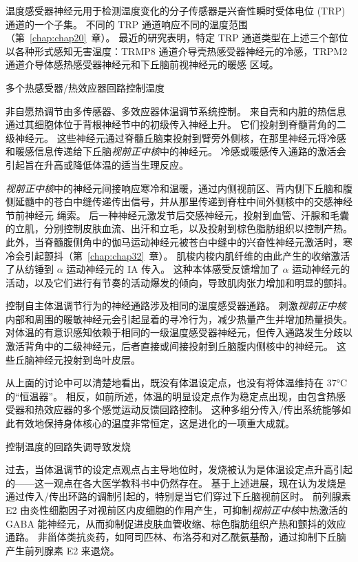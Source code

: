 温度感受器神经元用于检测温度变化的分子传感器是兴奋性瞬时受体电位 (TRP) 通道的一个子集。
不同的 TRP 通道响应不同的温度范围（第~\ref{chap:chap20}~章）。
最近的研究表明，特定 TRP 通道类型在上述三个部位以各种形式感知无害温度：TRMP8 通道介导壳热感受器神经元的冷感，TRPM2 通道介导体感热感受器神经元和下丘脑前视神经元的暖感 区域。


多个热感受器/热效应器回路控制温度

非自愿热调节由多传感器、多效应器体温调节系统控制。
来自壳和内脏的热信息通过其细胞体位于背根神经节中的初级传入神经上升。
它们投射到脊髓背角的二级神经元。
这些神经元通过脊髓丘脑束投射到臂旁外侧核，在那里神经元将冷感和暖感信息传递给下丘脑\textit{视前正中核}中的神经元。
冷感或暖感传入通路的激活会引起旨在升高或降低体温的适当生理反应。


\textit{视前正中核}中的神经元间接响应寒冷和温暖，通过内侧视前区、背内侧下丘脑和腹侧延髓中的苍白中缝传递传出信号，并从那里传递到脊柱中间外侧核中的交感神经节前神经元 绳索。
后一种神经元激发节后交感神经元，投射到血管、汗腺和毛囊的立肌，分别控制皮肤血流、出汗和立毛，以及投射到棕色脂肪组织以控制产热。
此外，当脊髓腹侧角中的伽马运动神经元被苍白中缝中的兴奋性神经元激活时，寒冷会引起颤抖（第~\ref{chap:chap32}~章）。
肌梭内梭内肌纤维的由此产生的收缩激活了从纺锤到 $ \alpha $ 运动神经元的 IA 传入。
这种本体感受反馈增加了 $ \alpha $ 运动神经元的活动，以及它们进行有节奏的活动爆发的倾向，导致肌肉张力增加和明显的颤抖。


控制自主体温调节行为的神经通路涉及相同的温度感受器通路。
刺激\textit{视前正中核}内部和周围的暖敏神经元会引起显着的寻冷行为，减少热量产生并增加热量损失。
对体温的有意识感知依赖于相同的一级温度感受器神经元，但传入通路发生分歧以激活背角中的二级神经元，后者直接或间接投射到丘脑腹内侧核中的神经元。
这些丘脑神经元投射到岛叶皮层。


从上面的讨论中可以清楚地看出，既没有体温设定点，也没有将体温维持在 37°C 的“恒温器”。
相反，如前所述，体温的明显设定点作为稳定点出现，由包含热感受器和热效应器的多个感觉运动反馈回路控制。
这种多组分传入/传出系统能够如此有效地保持身体核心的温度非常恒定，这是进化的一项重大成就。


控制温度的回路失调导致发烧

过去，当体温调节的设定点观点占主导地位时，发烧被认为是体温设定点升高引起的——这一观点在各大医学教科书中仍然存在。
基于上述进展，现在认为发烧是通过传入/传出环路的调制引起的，特别是当它们穿过下丘脑视前区时。
前列腺素 E2 由炎性细胞因子对视前区内皮细胞的作用产生，可抑制\textit{视前正中核}中热激活的 GABA 能神经元，从而抑制促进皮肤血管收缩、棕色脂肪组织产热和颤抖的效应通路。
非甾体类抗炎药，如阿司匹林、布洛芬和对乙酰氨基酚，通过抑制下丘脑产生前列腺素 E2 来退烧。



